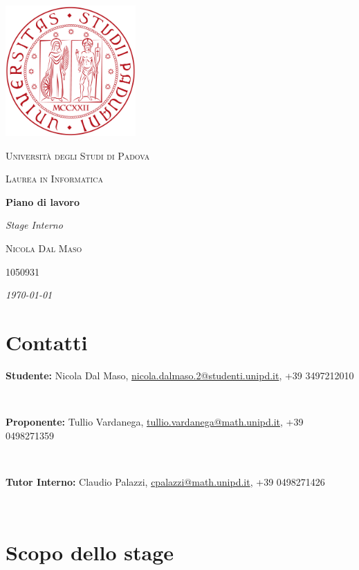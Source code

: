 \documentclass[a4paper]{article}
\makeatletter
\newcommand{\nomeStudente}{Nicola}
\newcommand{\cognomeStudente}{Dal Maso}
\newcommand{\matricolaStudente}{1050931}
\newcommand{\emailStudente}{nicola.dalmaso.2@studenti.unipd.it}
\newcommand{\telStudente}{+39 3497212010}
\newcommand{\nomeProponente}{Tullio}
\newcommand{\cognomeProponente}{Vardanega}
\newcommand{\emailProponente}{tullio.vardanega@math.unipd.it}
\newcommand{\telProponente}{+39 0498271359}
\newcommand{\nomeTutorInterno}{Claudio}
\newcommand{\cognomeTutorInterno}{Palazzi}
\newcommand{\emailTutorInterno}{cpalazzi@math.unipd.it}
\newcommand{\telTutorInterno}{+39 0498271426}
\makeatother
\begin{document}
\begin{titlepage}
	\centering
	\includegraphics[height=5cm]{./immagini/logo-unipd.png} \par \vspace{1cm}
	{\scshape\LARGE Università degli Studi di Padova \par}
	\vspace{0.5cm}
	{\scshape\Large Laurea in Informatica \par}
	\vspace{1cm}
	{\Huge\bfseries Piano di lavoro \par}
	\vspace{0.5cm}
	{\Large\itshape Stage Interno}
	\vfill
	{\scshape\Large \nomeStudente{} \cognomeStudente{}\par}
	{\scshape\large \matricolaStudente \par}
	\vfill
	{\itshape \today}
	
\end{titlepage}

\section*{Contatti}
\parbox{14.7cm}{\textbf{Studente:} \nomeStudente{} \cognomeStudente{}, \href{mailto:\emailStudente{}}{\emailStudente{}}, \telStudente{}} \\

\noindent
\parbox{14.7cm}{\textbf{Proponente:} \nomeProponente{} \cognomeProponente{}, \href{mailto:\emailProponente{}}{\emailProponente{}}, \telProponente{}} \\

\noindent
\parbox{14.7cm}{\textbf{Tutor Interno:} \nomeTutorInterno{} \cognomeTutorInterno{}, \href{mailto:\emailTutorInterno{}}{\emailTutorInterno{}}, \telTutorInterno{}} \\

\section*{Scopo dello stage}
\end{document}
